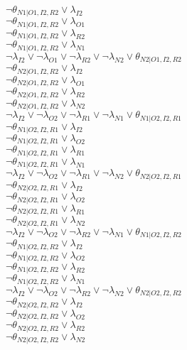$\neg\theta_{N1|O1,I2,R2} \vee \lambda_{I2}$\\
$\neg\theta_{N1|O1,I2,R2} \vee \lambda_{O1}$\\
$\neg\theta_{N1|O1,I2,R2} \vee \lambda_{R2}$\\
$\neg\theta_{N1|O1,I2,R2} \vee \lambda_{N1}$\\
$\neg\lambda_{I2} \vee \neg\lambda_{O1} \vee \neg\lambda_{R2} \vee \neg\lambda_{N2} \vee \theta_{N2|O1,I2,R2}$\\
$\neg\theta_{N2|O1,I2,R2} \vee \lambda_{I2}$\\
$\neg\theta_{N2|O1,I2,R2} \vee \lambda_{O1}$\\
$\neg\theta_{N2|O1,I2,R2} \vee \lambda_{R2}$\\
$\neg\theta_{N2|O1,I2,R2} \vee \lambda_{N2}$\\
$\neg\lambda_{I2} \vee \neg\lambda_{O2} \vee \neg\lambda_{R1} \vee \neg\lambda_{N1} \vee \theta_{N1|O2,I2,R1}$\\
$\neg\theta_{N1|O2,I2,R1} \vee \lambda_{I2}$\\
$\neg\theta_{N1|O2,I2,R1} \vee \lambda_{O2}$\\
$\neg\theta_{N1|O2,I2,R1} \vee \lambda_{R1}$\\
$\neg\theta_{N1|O2,I2,R1} \vee \lambda_{N1}$\\
$\neg\lambda_{I2} \vee \neg\lambda_{O2} \vee \neg\lambda_{R1} \vee \neg\lambda_{N2} \vee \theta_{N2|O2,I2,R1}$\\
$\neg\theta_{N2|O2,I2,R1} \vee \lambda_{I2}$\\
$\neg\theta_{N2|O2,I2,R1} \vee \lambda_{O2}$\\
$\neg\theta_{N2|O2,I2,R1} \vee \lambda_{R1}$\\
$\neg\theta_{N2|O2,I2,R1} \vee \lambda_{N2}$\\
$\neg\lambda_{I2} \vee \neg\lambda_{O2} \vee \neg\lambda_{R2} \vee \neg\lambda_{N1} \vee \theta_{N1|O2,I2,R2}$\\
$\neg\theta_{N1|O2,I2,R2} \vee \lambda_{I2}$\\
$\neg\theta_{N1|O2,I2,R2} \vee \lambda_{O2}$\\
$\neg\theta_{N1|O2,I2,R2} \vee \lambda_{R2}$\\
$\neg\theta_{N1|O2,I2,R2} \vee \lambda_{N1}$\\
$\neg\lambda_{I2} \vee \neg\lambda_{O2} \vee \neg\lambda_{R2} \vee \neg\lambda_{N2} \vee \theta_{N2|O2,I2,R2}$\\
$\neg\theta_{N2|O2,I2,R2} \vee \lambda_{I2}$\\
$\neg\theta_{N2|O2,I2,R2} \vee \lambda_{O2}$\\
$\neg\theta_{N2|O2,I2,R2} \vee \lambda_{R2}$\\
$\neg\theta_{N2|O2,I2,R2} \vee \lambda_{N2}$\\
